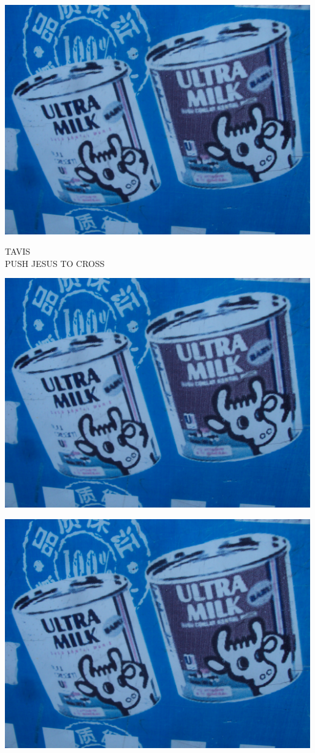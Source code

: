 \documentclass[10pt,letterpaper]{article}
\begin{document}
\vspace{0.25in}
\includegraphics[width=5.19in]{landscape.jpg}

TAVIS\\
PUSH JESUS TO CROSS\\
\pagebreak

\includegraphics[width=5.19in]{landscape.jpg}

\vspace{0.25in}
\includegraphics[width=5.19in]{landscape.jpg}
\end{document}
